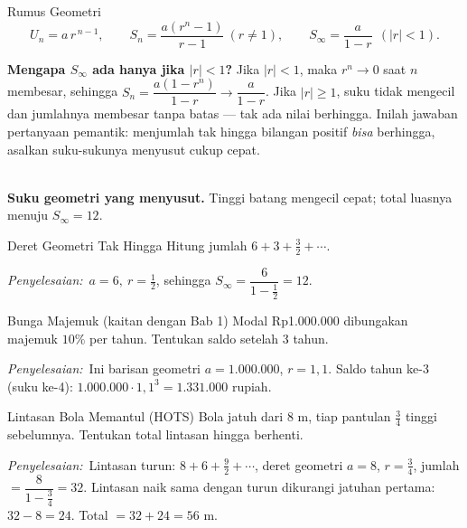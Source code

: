 \documentclass[11pt,a4paper]{report}
\theoremstyle{gaya}
\newcommand{\jawab}{\par\smallskip\noindent\textit{\textcolor{oranye}{Penyelesaian:}}\ }
\begin{document}
\begin{konsep}{Rumus Geometri}
\[
U_n = a\, r^{\,n-1}, \qquad
S_n = \frac{a(r^n - 1)}{r-1}\ (r \neq 1),\qquad
S_\infty = \frac{a}{1-r}\ \ (|r|<1).
\]
\end{konsep}

\textbf{Mengapa $S_\infty$ ada hanya jika $|r|<1$?} Jika $|r|<1$, maka $r^n\to 0$ saat $n$ membesar, sehingga $S_n=\dfrac{a(1-r^n)}{1-r}\to \dfrac{a}{1-r}$. Jika $|r|\ge 1$, suku tidak mengecil dan jumlahnya membesar tanpa batas --- tak ada nilai berhingga. Inilah jawaban pertanyaan pemantik: menjumlah tak hingga bilangan positif \emph{bisa} berhingga, asalkan suku-sukunya menyusut cukup cepat.

\begin{center}
\\
\small \textbf{Suku geometri yang menyusut.} Tinggi batang mengecil cepat; total luasnya menuju $S_\infty=12$.
\end{center}

\begin{contoh}{Deret Geometri Tak Hingga}
Hitung jumlah $6 + 3 + \tfrac{3}{2} + \cdots$.

\jawab $a = 6,\ r = \tfrac12$, sehingga $S_\infty = \dfrac{6}{1-\frac12} = 12.$
\end{contoh}

\begin{contoh}{Bunga Majemuk (kaitan dengan Bab 1)}
Modal Rp1.000.000 dibungakan majemuk $10\%$ per tahun. Tentukan saldo setelah 3 tahun.

\jawab Ini barisan geometri $a=1.000.000$, $r=1{,}1$. Saldo tahun ke-3 (suku ke-4): $1.000.000\cdot 1{,}1^3 = 1.331.000$ rupiah.
\end{contoh}

\begin{contoh}{Lintasan Bola Memantul (HOTS)}
Bola jatuh dari 8 m, tiap pantulan $\tfrac34$ tinggi sebelumnya. Tentukan total lintasan hingga berhenti.

\jawab Lintasan turun: $8+6+\tfrac92+\cdots$, deret geometri $a=8$, $r=\tfrac34$, jumlah $=\dfrac{8}{1-\frac34}=32$. Lintasan naik sama dengan turun dikurangi jatuhan pertama: $32-8=24$. Total $=32+24=56$ m.
\end{contoh}
\end{document}

